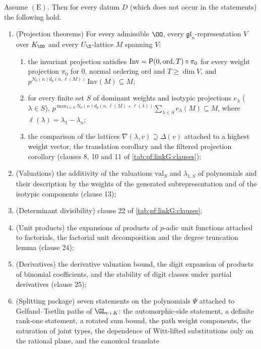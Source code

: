\begin{theorem}\label{pf:sh-curv:tools}
Assume $(\mathrm E)$. Then for every datum $D$ (which does not occur in the statements) the following hold.
\begin{enumerate}[label=(T\arabic*)]
\item (Projection theorems) For every admissible $\OO$, every $\mathfrak{gl}_n$-representation $V$ over $K_\OO$ and every
$U_\Z$-lattice $M$ spanning $V$:
\begin{enumerate}[label=(\alph*)]
\item the invariant projection satisfies $\mathrm{Inv}=\mathsf P(0,\mathrm{ord},T)\circ\pi_0$ for every weight projection
$\pi_0$ for $0$, normal ordering $\mathrm{ord}$ and $T\ge\dim V$, and $p^{N_0(n)d_p(n,\ell(M))}\,\mathrm{Inv}(M)\subseteq M$;
\item for every finite set $S$ of dominant weights and isotypic projections $e_\lambda$ ($\lambda\in S$),
$p^{\max_{\lambda\in S}N_0(n)d_p(n,\ell(M)+\ell(\lambda))}\sum_{\lambda\in S}e_\lambda(M)\subseteq M$, where
$\ell(\lambda)=\lambda_1-\lambda_n$;
\item the comparison of the lattices $\nabla(\lambda,v)\supseteq\Delta(v)$ attached to a highest weight vector, the
translation corollary and the filtered projection corollary (clauses 8, 10 and 11 of \cref{tab:pf:linkG:clauses});
\end{enumerate}
\item (Valuations) the additivity of the valuations $\mathrm{val}_S$ and $\lambda_{1,S}$ of polynomials and their description
by the weights of the generated subrepresentation and of the isotypic components (clause 13);
\item (Determinant divisibility) clause 22 of \cref{tab:pf:linkG:clauses};
\item (Unit products) the expansions of products of $p$-adic unit functions attached to factorials, the factorial unit
decomposition and the degree truncation lemma (clause 24);
\item (Derivatives) the derivative valuation bound, the digit expansion of products of binomial coefficients, and the
stability of digit classes under partial derivatives (clause 25);
\item (Splitting package) seven statements on the polynomials $\Psi$ attached to Gelfand--Tsetlin paths of $\GL_{r+K}$:
the automorphic-side statement, a definite rank-one statement, a rotated sum bound, the path weight components, the
saturation of joint types, the dependence of Witt-lifted substitutions only on the rational plane, and the canonical translate

\end{enumerate}
\end{theorem}
